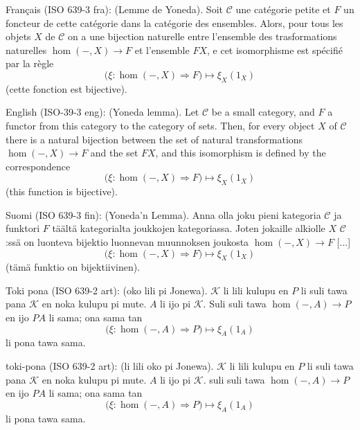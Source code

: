 \documentclass{article}
\newcommand{\tran}[3]{%
	\noindent\textsf{#1:} (#2). #3%
	\medskip\newline
}
\begin{document}
\tran{Français (ISO 639-3 fra)}{Lemme de Yoneda}{
	Soit $\mathcal C$ une catégorie petite et $F$ un foncteur de cette catégorie dans la catégorie des ensembles. Alors, pour tous les objets $X$ de $\mathcal C$ on a une bijection naturelle entre l'ensemble des trasformations naturelles $\hom(-,X)\to F$ et l'ensemble $FX$, e cet isomorphisme est spécifié par la règle
	\[
		\Big(\xi : \hom(-,X)\Rightarrow F\Big) \mapsto \xi_X(1_X)
	\]
	(cette fonction est bijective).
}
\tran{English (ISO-39-3 eng)}{Yoneda lemma}{
Let $\mathcal C$ be a small category, and $F$ a functor from this category to the category of sets. Then, for every object $X$ of $\mathcal C$ there is a natural bijection between the set of natural transformations $\hom(-,X)\to F$ and the set $FX$, and this isomorphism is defined by the correspondence
\[
	\Big(\xi : \hom(-,X)\Rightarrow F\Big) \mapsto \xi_X(1_X)
\]
(this function is bijective).
}
\tran{Suomi (ISO 639-3 fin)}{Yoneda'n Lemma}{
	Anna olla joku pieni kategoria $\mathcal C$ ja funktori $F$ täältä kategorialta joukkojen kategoriassa. Joten jokaille alkiolle $X$ $\mathcal C$:ssä on luonteva bijektio luonnevan muunnoksen joukosta $\hom(-,X)\to F$ [...]
	\[
		\Big(\xi : \hom(-,X)\Rightarrow F\Big) \mapsto \xi_X(1_X)
	\]
	(tämä funktio on bijektiivinen).
}
\tran{Toki pona (ISO 639-2 art)}{oko lili pi Jonewa}{$\mathcal K$ li lili kulupu en $P$ li suli tawa pana $\mathcal K$ en noka kulupu pi mute. $A$ li ijo pi $\mathcal K$. Suli suli tawa $\hom(-,A)\to P$ en ijo $PA$ li sama; ona sama tan
\[
	\Big(\xi : \hom(-,A)\Rightarrow P\Big) \mapsto \xi_A(1_A)
\]
li pona tawa sama.}
\tran{{\tp toki-pona} (ISO 639-2 art)}{{\tp li lili oko pi Jonewa}}{$\mathcal K$ {\tp li lili kulupu en} $P$ {\tp li suli tawa pana} $\mathcal K$ {\tp en noka kulupu pi mute}. $A$ {\tp li ijo pi} $\mathcal K$. {\tp suli suli tawa} $\hom(-,A)\to P$ {\tp en ijo} $PA$ {\tp li sama; ona sama tan}
\[
	\Big(\xi : \hom(-,A)\Rightarrow P\Big) \mapsto \xi_A(1_A)
\]
li pona tawa sama.}
\end{document}
